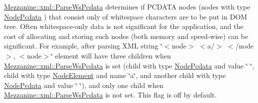 \begin{DoxyItemize}
\item \hyperlink{namespaceMezzanine_1_1xml_ad1540f35280d1c679102542125ed94ac}{Mezzanine::xml::ParseWsPcdata} determines if PCDATA nodes (nodes with type \hyperlink{namespaceMezzanine_1_1xml_a524d867e34ff408b8f45a51b7924cb80}{NodePcdata} ) that consist only of whitespace characters are to be put in DOM tree. Often whitespace-\/only data is not significant for the application, and the cost of allocating and storing such nodes (both memory and speed-\/wise) can be significant. For example, after parsing XML string \char`\"{}$<$node$>$ $<$a/$>$ $<$/node$>$, $<$node$>$\char`\"{} element will have three children when \hyperlink{namespaceMezzanine_1_1xml_ad1540f35280d1c679102542125ed94ac}{Mezzanine::xml::ParseWsPcdata} is set (child with type \hyperlink{namespaceMezzanine_1_1xml_a524d867e34ff408b8f45a51b7924cb80}{NodePcdata} and value \char`\"{} \char`\"{}, child with type \hyperlink{namespaceMezzanine_1_1xml_a524d867e34ff408b8f45a51b7924cb80}{NodeElement} and name \char`\"{}a\char`\"{}, and another child with type \hyperlink{namespaceMezzanine_1_1xml_a524d867e34ff408b8f45a51b7924cb80}{NodePcdata} and value \char`\"{} \char`\"{}), and only one child when \hyperlink{namespaceMezzanine_1_1xml_ad1540f35280d1c679102542125ed94ac}{Mezzanine::xml::ParseWsPcdata} is not set. This flag is off by default.
\end{DoxyItemize}

